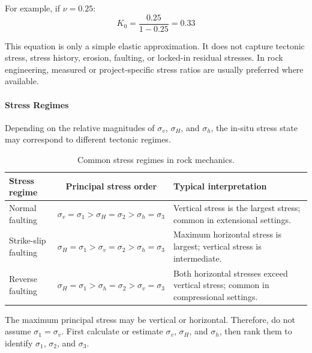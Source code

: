 For example, if \(\nu = 0.25\):
\[
K_0 = \frac{0.25}{1-0.25} = 0.33
\]

\begin{warnbox}[Do not overuse K0 = nu/(1-nu)]
This equation is only a simple elastic approximation. It does not capture tectonic stress,
stress history, erosion, faulting, or locked-in residual stresses. In rock engineering,
measured or project-specific stress ratios are usually preferred where available.
\end{warnbox}

\paragraph{Stress Regimes}

Depending on the relative magnitudes of \(\sigma_v\), \(\sigma_H\), and \(\sigma_h\), the
in-situ stress state may correspond to different tectonic regimes.

\begin{table}[H]
\centering
\small
\begin{tabularx}{\textwidth}{l c Y}
\toprule
\textbf{Stress regime} & \textbf{Principal stress order} & \textbf{Typical interpretation} \\
\midrule
Normal faulting &
\(\sigma_v = \sigma_1 > \sigma_H = \sigma_2 > \sigma_h = \sigma_3\) &
Vertical stress is the largest stress; common in extensional settings. \\
\midrule
Strike-slip faulting &
\(\sigma_H = \sigma_1 > \sigma_v = \sigma_2 > \sigma_h = \sigma_3\) &
Maximum horizontal stress is largest; vertical stress is intermediate. \\
\midrule
Reverse faulting &
\(\sigma_H = \sigma_1 > \sigma_h = \sigma_2 > \sigma_v = \sigma_3\) &
Both horizontal stresses exceed vertical stress; common in compressional settings. \\
\bottomrule
\end{tabularx}
\caption{Common stress regimes in rock mechanics.}
\end{table}

\begin{keybox}
The maximum principal stress may be vertical or horizontal. Therefore, do not assume
\(\sigma_1=\sigma_v\). First calculate or estimate \(\sigma_v\), \(\sigma_H\), and \(\sigma_h\),
then rank them to identify \(\sigma_1\), \(\sigma_2\), and \(\sigma_3\).
\end{keybox}

